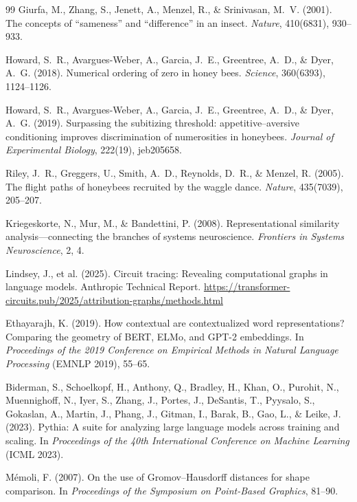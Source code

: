 \documentclass[12pt]{article}
\begin{document}
\begin{thebibliography}{99}
Giurfa, M., Zhang, S., Jenett, A., Menzel, R., \& Srinivasan, M.~V.
(2001).
The concepts of ``sameness'' and ``difference'' in an insect.
\textit{Nature}, 410(6831), 930--933.

Howard, S.~R., Avargues-Weber, A., Garcia, J.~E., Greentree, A.~D.,
\& Dyer, A.~G. (2018).
Numerical ordering of zero in honey bees.
\textit{Science}, 360(6393), 1124--1126.

Howard, S.~R., Avargues-Weber, A., Garcia, J.~E., Greentree, A.~D.,
\& Dyer, A.~G. (2019).
Surpassing the subitizing threshold: appetitive--aversive conditioning
improves discrimination of numerosities in honeybees.
\textit{Journal of Experimental Biology}, 222(19), jeb205658.

Riley, J.~R., Greggers, U., Smith, A.~D., Reynolds, D.~R., \&
Menzel, R. (2005).
The flight paths of honeybees recruited by the waggle dance.
\textit{Nature}, 435(7039), 205--207.

Kriegeskorte, N., Mur, M., \& Bandettini, P. (2008).
Representational similarity analysis---connecting the branches of
systems neuroscience.
\textit{Frontiers in Systems Neuroscience}, 2, 4.

Lindsey, J., et al. (2025).
Circuit tracing: Revealing computational graphs in language models.
Anthropic Technical Report.
\url{https://transformer-circuits.pub/2025/attribution-graphs/methods.html}

Ethayarajh, K. (2019).
How contextual are contextualized word representations?
Comparing the geometry of {BERT}, {ELMo}, and {GPT-2} embeddings.
In \textit{Proceedings of the 2019 Conference on Empirical Methods
in Natural Language Processing} (EMNLP 2019), 55--65.

Biderman, S., Schoelkopf, H., Anthony, Q., Bradley, H., Khan, O.,
Purohit, N., Muennighoff, N., Iyer, S., Zhang, J., Portes, J.,
DeSantis, T., Pyysalo, S., Gokaslan, A., Martin, J., Phang, J.,
Gitman, I., Barak, B., Gao, L., \& Leike, J. (2023).
Pythia: A suite for analyzing large language models across training and
scaling.
In \textit{Proceedings of the 40th International Conference on Machine
Learning} (ICML 2023).

M\'emoli, F. (2007).
On the use of Gromov--Hausdorff distances for shape comparison.
In \textit{Proceedings of the Symposium on Point-Based Graphics}, 81--90.

\end{thebibliography}
\end{document}
